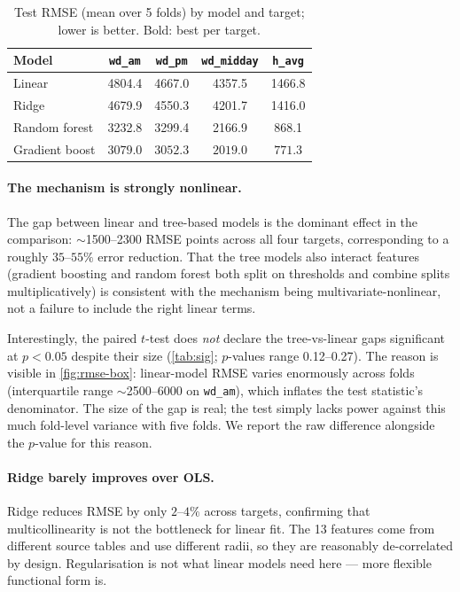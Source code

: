 \documentclass{article}
\begin{document}
\begin{table}[t]
  \centering
  \small
  \caption{Test RMSE (mean over 5 folds) by model and target; lower is
    better. Bold: best per target.}
  \label{tab:main-results}
  \begin{tabular}{@{}lcccc@{}}
    \toprule
    Model          & \texttt{wd\_am}   & \texttt{wd\_pm}   & \texttt{wd\_midday} & \texttt{h\_avg}  \\
    \midrule
    Linear         & 4804.4            & 4667.0            & 4357.5              & 1466.8           \\
    Ridge          & 4679.9            & 4550.3            & 4201.7              & 1416.0           \\
    Random forest  & 3232.8            & 3299.4            & 2166.9              & 868.1            \\
    Gradient boost & $\mathbf{3079.0}$ & $\mathbf{3052.3}$ & $\mathbf{2019.0}$   & $\mathbf{771.3}$ \\
    \bottomrule
  \end{tabular}
\end{table}

\paragraph{The mechanism is strongly nonlinear.}
The gap between linear and tree-based models is the dominant effect in
the comparison: $\sim$1500--2300 RMSE points across all four targets,
corresponding to a roughly $35$--$55\%$ error reduction. That the tree
models also interact features (gradient boosting and random forest
both split on thresholds and combine splits multiplicatively) is
consistent with the mechanism being multivariate-nonlinear, not a
failure to include the right linear terms.

Interestingly, the paired $t$-test does \emph{not} declare the
tree-vs-linear gaps significant at $p<0.05$ despite their size
(\cref{tab:sig}; $p$-values range 0.12--0.27). The reason is visible in
\cref{fig:rmse-box}: linear-model RMSE varies enormously across folds
(interquartile range $\sim$2500--6000 on \texttt{wd\_am}), which inflates
the test statistic's denominator. The size of the gap is real; the test
simply lacks power against this much fold-level variance with five
folds. We report the raw difference alongside the $p$-value for this
reason.

\paragraph{Ridge barely improves over OLS.}
Ridge reduces RMSE by only $2$--$4\%$ across targets, confirming that
multicollinearity is not the bottleneck for linear fit. The 13 features
come from different source tables and use different radii, so they are
reasonably de-correlated by design. Regularisation is not what linear
models need here --- more flexible functional form is.
\end{document}
